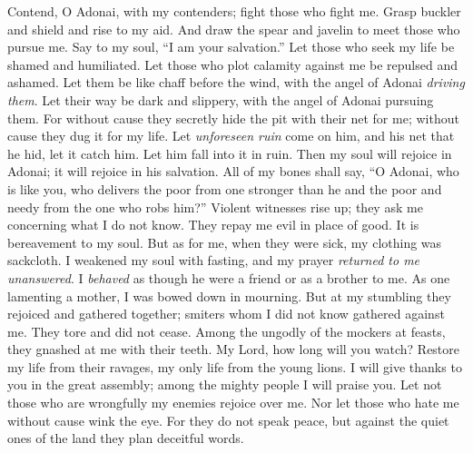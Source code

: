 \begin{biblechapter} %
 Contend, O Adonai, with my contenders; 
fight those who fight me.
\verse Grasp buckler and shield 
and rise to my aid.
\verse And draw the spear and javelin to meet those who pursue me. 
Say to my soul, “I am your salvation.”
\verse Let those who seek my life be shamed and humiliated. 
Let those who plot calamity against me be repulsed and ashamed.
\verse Let them be like chaff before the wind, 
with the angel of Adonai \textit{driving them}.
\verse Let their way be dark and slippery, 
with the angel of Adonai pursuing them.
\verse For without cause they secretly hide the pit with their net for me; 
without cause they dug it for my life.
\verse Let \textit{unforeseen ruin} come on him, 
and his net that he hid, let it catch him. 
Let him fall into it in ruin.
\verse Then my soul will rejoice in Adonai; 
it will rejoice in his salvation.
\verse All of my bones shall say, “O Adonai, who is like you, 
who delivers the poor from one stronger than he 
and the poor and needy from the one who robs him?”
\verse Violent witnesses rise up; 
they ask me concerning what I do not know.
\verse They repay me evil in place of good. 
It is bereavement to my soul.
\verse But as for me, when they were sick, my clothing was sackcloth. 
I weakened my soul with fasting, 
and my prayer \textit{returned to me unanswered}.
\verse I \textit{behaved} as though he were a friend or as a brother to me. 
As one lamenting a mother, I was bowed down in mourning.
\verse But at my stumbling they rejoiced and gathered together; 
smiters whom I did not know gathered against me. 
They tore and did not cease.
\verse Among the ungodly of the mockers at feasts, 
they gnashed at me with their teeth.
\verse My Lord, how long will you watch? 
Restore my life from their ravages, 
my only life from the young lions.
\verse I will give thanks to you in the great assembly; 
among the mighty people I will praise you.
\verse Let not those who are wrongfully my enemies rejoice over me. 
Nor let those who hate me without cause wink the eye.
\verse For they do not speak peace, 
but against the quiet ones of the land 
they plan deceitful words.

\end{biblechapter}
